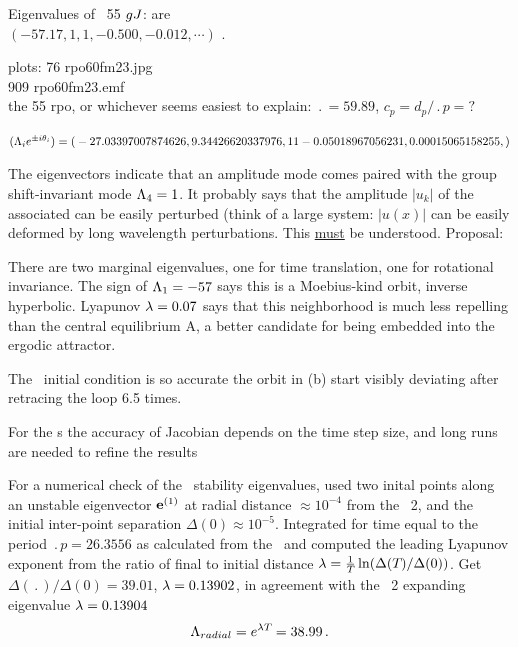 Eigenvalues of \rpo\ {\nameit}55 $g{J}$: are
\\
$(-57.17,  1, 1, -0.500, -0.012, \cdots)$ .
%

plots:
  76 rpo60fm23.jpg	\\
 909 rpo60fm23.emf	\\
the 55 rpo, or whichever seems easiest to explain:
$\period{} = 59.89$,
$c_p = d_p/\period{p}= ?$

$(\Lambda_i e^{\pm i\theta_i})=
(
\\
 -27.03397007874626,
\\
   9.34426620337976,
\\
   1
\\
   1
\\
  -0.05018967056231,
\\
   0.00015065158255,
)$

The eigenvectors
indicate that an amplitude mode comes paired with the 
group shift-invariant mode $\Lambda_4 =1$. It probably says that
the amplitude $|u_k|$ of the associated can be easily perturbed (think of
a large system: $|u(x)|$ can be easily deformed by long wavelength
perturbations. This \underline{must} be understood. Proposal:

There are two
marginal eigenvalues, one for time translation, one for
rotational invariance. 
The sign of $\Lambda_{1}=-57$ says this is a Moebius-kind orbit,
inverse hyperbolic.
Lyapunov $\lambda=0.07$ says that this neighborhood is much less repelling than
the central equilibrium A, a better candidate for being embedded into the
ergodic attractor.

The \rpo\ initial condition is
so accurate the orbit in (b)
start visibly deviating after retracing the loop 6.5 times.

For the \rpo s the accuracy of Jacobian depends
on the time step size, and long runs are needed to refine the results

For a numerical check of the \rpo\ stability eigenvalues,
used two inital
points along an unstable eigenvector ${\bf e}^{(1)}$
at radial distance  $\approx 10^{-4}$ from the \eqv\ {\nameit}2,
and the initial inter-point separation $\Delta(0) \approx 10^{-5}$.
Integrated for time equal to the period $\period{p}=26.3556$ as calculated from
the \jacobianM\ and computed the leading Lyapunov exponent from the ratio of
final to initial distance 
$\lambda= {1 \over {T_{}}}\ln( \Delta({T_{}})/\Delta(0))$.
Get
$\Delta(\period{})/\Delta(0) =39.01$,
$\lambda=0.13902$, in agreement with the \eqv\ {\nameit}2 
expanding eigenvalue $\lambda=0.13904$
\[
\Lambda_{radial} =  e^{\lambda {T_{}}} =38.99
\,.
\]

